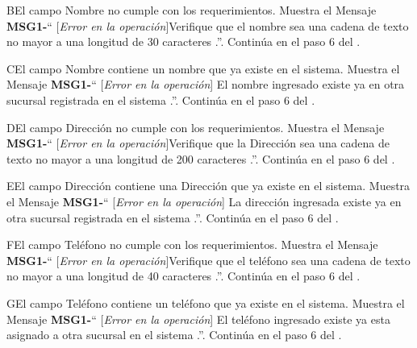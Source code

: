 

\begin{UCtrayectoriaA}{B}{El campo Nombre no cumple con los requerimientos.}
			\UCpaso Muestra el Mensaje {\bf MSG1-}`` [{\em Error en la operación}]Verifique que el nombre sea una cadena de texto no mayor a una longitud de 30 caracteres .''.
			\UCpaso Continúa en el paso 6 del .
		\end{UCtrayectoriaA}
\begin{UCtrayectoriaA}{C}{El campo Nombre contiene un nombre que ya existe en el sistema.}
			\UCpaso Muestra el Mensaje {\bf MSG1-}`` [{\em Error en la operación}] El nombre ingresado existe ya en otra sucursal registrada en el sistema  .''.
			\UCpaso Continúa en el paso 6 del .
		\end{UCtrayectoriaA}

\begin{UCtrayectoriaA}{D}{El campo Dirección no cumple con los requerimientos.}
			\UCpaso Muestra el Mensaje {\bf MSG1-}`` [{\em Error en la operación}]Verifique que la Dirección sea una cadena de texto no mayor a una longitud de 200 caracteres  .''.
			\UCpaso Continúa en el paso 6 del .
		\end{UCtrayectoriaA}
\begin{UCtrayectoriaA}{E}{El campo Dirección contiene una Dirección que ya existe en el sistema.}
			\UCpaso Muestra el Mensaje {\bf MSG1-}`` [{\em Error en la operación}] La dirección ingresada existe ya en otra sucursal registrada en el sistema  .''.
			\UCpaso Continúa en el paso 6 del .
		\end{UCtrayectoriaA}
\begin{UCtrayectoriaA}{F}{El campo Teléfono no cumple con los requerimientos.}
			\UCpaso Muestra el Mensaje {\bf MSG1-}`` [{\em Error en la operación}]Verifique que el teléfono sea una cadena de texto no mayor a una longitud de 40 caracteres  .''.
			\UCpaso Continúa en el paso 6 del .
		\end{UCtrayectoriaA}
\begin{UCtrayectoriaA}{G}{El campo Teléfono contiene un teléfono que ya existe en el sistema.}
			\UCpaso Muestra el Mensaje {\bf MSG1-}`` [{\em Error en la operación}] El teléfono ingresado existe ya esta asignado a otra sucursal en el sistema  .''.
			\UCpaso Continúa en el paso 6 del .
		\end{UCtrayectoriaA}

